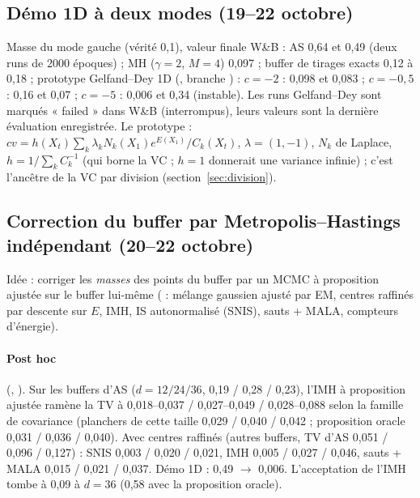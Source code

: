 \subsection{Démo 1D à deux modes (19--22 octobre)}
Masse du mode gauche (vérité 0,1), valeur finale W\&B : AS 0,64 et 0,49 (deux runs de 2000 époques) ; MH ($\gamma=2$, $M=4$) 0,097 ; buffer de tirages exacts 0,12 à 0,18 ; prototype Gelfand--Dey 1D (, branche ) : $c=-2$ : 0,098 et 0,083 ; $c=-0{,}5$ : 0,16 et 0,07 ; $c=-5$ : 0,006 et 0,34 (instable). Les runs Gelfand--Dey sont marqués « failed » dans W\&B (interrompus), leurs valeurs sont la dernière évaluation enregistrée. Le prototype : $cv=h(X_t)\sum_k\lambda_kN_k(X_1)e^{E(X_1)}/C_k(X_t)$, $\lambda=(1,-1)$, $N_k$ de Laplace, $h=1/\sum_kC_k^{-1}$ (qui borne la VC ; $h=1$ donnerait une variance infinie) ; c'est l'ancêtre de la VC par division (section~\ref{sec:division}).

\subsection{Correction du buffer par Metropolis--Hastings indépendant (20--22 octobre)}
Idée : corriger les \emph{masses} des points du buffer par un MCMC à proposition ajustée sur le buffer lui-même ( : mélange gaussien ajusté par EM, centres raffinés par descente sur $E$, IMH, IS autonormalisé (SNIS), sauts + MALA, compteurs d'énergie).
\paragraph{Post hoc} (, ). Sur les buffers d'AS ($d=12/24/36$,  0,19 / 0,28 / 0,23), l'IMH à proposition ajustée ramène la TV à 0,018--0,037 / 0,027--0,049 / 0,028--0,088 selon la famille de covariance (planchers de cette taille 0,029 / 0,040 / 0,042 ; proposition oracle 0,031 / 0,036 / 0,040). Avec centres raffinés (autres buffers, TV d'AS 0,051 / 0,096 / 0,127) : SNIS 0,003 / 0,020 / 0,021, IMH 0,005 / 0,027 / 0,046, sauts + MALA 0,015 / 0,021 / 0,037. Démo 1D : 0,49 $\to$ 0,006. L'acceptation de l'IMH tombe à 0,09 à $d=36$ (0,58 avec la proposition oracle).
